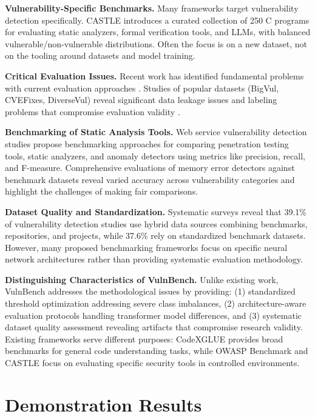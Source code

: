 \documentclass[letterpaper]{article}
\begin{document}
\textbf{Vulnerability-Specific Benchmarks.} Many frameworks target vulnerability detection specifically. CASTLE \citep{castle2025} introduces a curated collection of 250 C programs for evaluating static analyzers, formal verification tools, and LLMs, with balanced vulnerable/non-vulnerable distributions. Often the focus is on a new dataset, not on the tooling around datasets and model training.

\textbf{Critical Evaluation Issues.} Recent work has identified fundamental problems with current evaluation approaches \citep{risse2025top}. Studies of popular datasets (BigVul, CVEFixes, DiverseVul) reveal significant data leakage issues and labeling problems that compromise evaluation validity \citep{ullah2024vulnerability}.

\textbf{Benchmarking of Static Analysis Tools.} Web service vulnerability detection studies \citep{antunes2010benchmarking} propose benchmarking approaches for comparing penetration testing tools, static analyzers, and anomaly detectors using metrics like precision, recall, and F-measure. Comprehensive evaluations of memory error detectors \citep{zhang2021evaluating} against benchmark datasets reveal varied accuracy across vulnerability categories and highlight the challenges of making fair comparisons.

\textbf{Dataset Quality and Standardization.} Systematic surveys \citep{systematic2024survey} reveal that 39.1\% of vulnerability detection studies use hybrid data sources combining benchmarks, repositories, and projects, while 37.6\% rely on standardized benchmark datasets. However, many proposed benchmarking frameworks \citep{lin2020deep} focus on specific neural network architectures rather than providing systematic evaluation methodology.

\textbf{Distinguishing Characteristics of VulnBench.} Unlike existing work, VulnBench addresses the methodological issues by providing: (1) standardized threshold optimization addressing severe class imbalances, (2) architecture-aware evaluation protocols handling transformer model differences, and (3) systematic dataset quality assessment revealing artifacts that compromise research validity. Existing frameworks serve different purposes: CodeXGLUE provides broad benchmarks for general code understanding tasks, while OWASP Benchmark and CASTLE focus on evaluating specific security tools in controlled environments.

\section{Demonstration Results}
\end{document}
